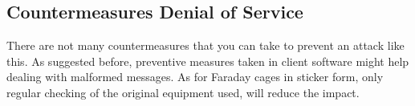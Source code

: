 \subsection{Countermeasures Denial of Service}
There are not many countermeasures that you can take to prevent an attack like this. As suggested before, preventive measures taken in client software might help dealing with malformed messages. 
As for Faraday cages in sticker form, only regular checking of the original equipment used, will reduce the impact.


